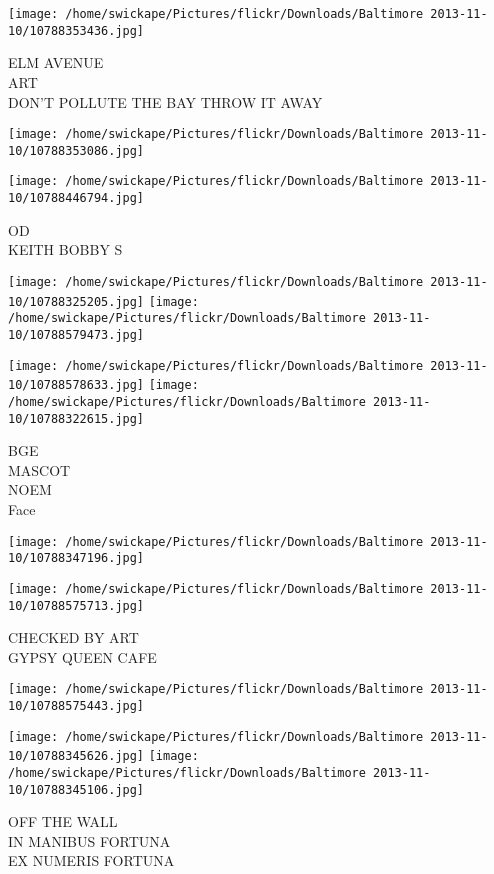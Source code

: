 \documentclass[10pt,letterpaper]{article}
\begin{document}
\vspace{0.25in}
\texttt{[image: /home/swickape/Pictures/flickr/Downloads/Baltimore 2013-11-10/10788353436.jpg]}

ELM AVENUE\\
ART\\
DON'T POLLUTE THE BAY THROW IT AWAY
\pagebreak

\texttt{[image: /home/swickape/Pictures/flickr/Downloads/Baltimore 2013-11-10/10788353086.jpg]}

\vspace{0.25in}
\texttt{[image: /home/swickape/Pictures/flickr/Downloads/Baltimore 2013-11-10/10788446794.jpg]}

OD\\
KEITH BOBBY S
\pagebreak

\texttt{[image: /home/swickape/Pictures/flickr/Downloads/Baltimore 2013-11-10/10788325205.jpg]}
\texttt{[image: /home/swickape/Pictures/flickr/Downloads/Baltimore 2013-11-10/10788579473.jpg]}

\texttt{[image: /home/swickape/Pictures/flickr/Downloads/Baltimore 2013-11-10/10788578633.jpg]}
\texttt{[image: /home/swickape/Pictures/flickr/Downloads/Baltimore 2013-11-10/10788322615.jpg]}

BGE\\
MASCOT\\
NOEM\\
Face
\pagebreak

\texttt{[image: /home/swickape/Pictures/flickr/Downloads/Baltimore 2013-11-10/10788347196.jpg]}

\vspace{0.25in}
\texttt{[image: /home/swickape/Pictures/flickr/Downloads/Baltimore 2013-11-10/10788575713.jpg]}

CHECKED BY ART\\
GYPSY QUEEN CAFE
\pagebreak

\texttt{[image: /home/swickape/Pictures/flickr/Downloads/Baltimore 2013-11-10/10788575443.jpg]}

\vspace{0.25in}
\texttt{[image: /home/swickape/Pictures/flickr/Downloads/Baltimore 2013-11-10/10788345626.jpg]}
\texttt{[image: /home/swickape/Pictures/flickr/Downloads/Baltimore 2013-11-10/10788345106.jpg]}

OFF THE WALL\\
IN MANIBUS FORTUNA\\
EX NUMERIS FORTUNA
\pagebreak
\end{document}
